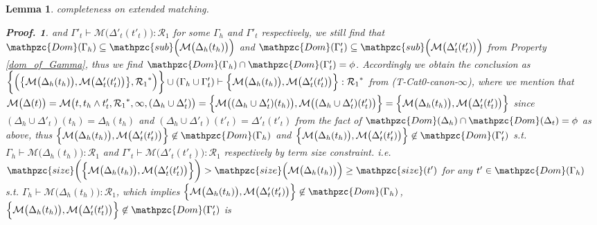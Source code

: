 \documentclass[12pt]{article}
\newtheorem{Lemma}{Lemma}[section]
\newtheorem{Proof}{Proof.}
\begin{document}
\begin{Lemma}{completeness on extended matching.}
\begin{Proof}
    and $\Gamma'_t \vdash \mathcal{M}\bigl(\Delta'_t(t'_t) \bigr) :
    \mathcal{R}_1$ for some $\Gamma_h$ and $\Gamma'_t$ respectively, we
    still find that
    $\mathpzc{Dom}(\Gamma_h) \subseteq \mathpzc{sub}\Bigl(\mathcal{M}\bigl(
    \Delta_h(t_h) \bigr) \Bigr)$ and
    $\mathpzc{Dom}(\Gamma'_t) \subseteq \mathpzc{sub}\Bigl(\mathcal{M}\bigl(
    \Delta'_t(t'_t) \bigr) \Bigr)$ from
    Property \ref{dom_of_Gamma}, thus we find
    $\mathpzc{Dom}(\Gamma_h) \cap \mathpzc{Dom}(\Gamma'_t) = \phi$.
    Accordingly we obtain the conclusion as
    $\biggl\{\Bigl(\bigl\{\mathcal{M}\bigl(\Delta_h(t_h) \bigr),
    \mathcal{M}\bigl(\Delta'_t(t'_t) \bigr) \bigr\}, {\mathcal{R}_1}^*
    \Bigr) \biggr\} \cup (\Gamma_h \cup \Gamma'_t) \vdash
    \Bigl\{\mathcal{M}\bigl(\Delta_h(t_h) \bigr), \mathcal{M}\bigl(
    \Delta'_t(t'_t) \bigr) \Bigr\} : {\mathcal{R}_1}^*$ from
    (T-Cat0-canon-$\infty$), where we mention that
    $\mathcal{M}\bigl(\Delta(t) \bigr) =
    \mathcal{M}\bigl(t, t_h \wedge t'_t, {\mathcal{R}_1}^*, \infty,
    (\Delta_h \cup \Delta'_t) \bigr) =
    \Bigl\{\mathcal{M}\bigl((\Delta_h \cup \Delta'_t)(t_h) \bigr),
    \mathcal{M}\bigl((\Delta_h \cup \Delta'_t)(t'_t) \bigr) \Bigr\} =
    \Bigl\{\mathcal{M}\bigl(\Delta_h(t_h) \bigr),
    \mathcal{M}\bigl(\Delta'_t(t'_t) \bigr) \Bigr\}$ since
    $(\Delta_h \cup \Delta'_t)(t_h) = \Delta_h(t_h)$ and
    $(\Delta_h \cup \Delta'_t)(t'_t) = \Delta'_t(t'_t)$ from the fact of
    $\mathpzc{Dom}(\Delta_h) \cap \mathpzc{Dom}(\Delta_t) = \phi$ as above,
    thus $\Bigl\{\mathcal{M}\bigl(\Delta_h(t_h) \bigr), \mathcal{M}\bigl(
    \Delta'_t(t'_t) \bigr) \Bigr\} \not\in \mathpzc{Dom}(\Gamma_h)$ and
    $\Bigl\{\mathcal{M}\bigl(\Delta_h(t_h) \bigr), \mathcal{M}\bigl(
    \Delta'_t(t'_t) \bigr) \Bigr\} \not\in \mathpzc{Dom}(\Gamma'_t)$ s.t.
    $\Gamma_h \vdash \mathcal{M}\bigl(\Delta_h(t_h) \bigr) : \mathcal{R}_1$
    and $\Gamma'_t \vdash \mathcal{M}\bigl(\Delta'_t(t'_t) \bigr) :
    \mathcal{R}_1$ respectively by term size constraint. i.e.
    $\mathpzc{size}\biggl(\Bigl\{\mathcal{M}\bigl(\Delta_h(t_h) \bigr),
    \mathcal{M}\bigl(\Delta'_t(t'_t) \bigr) \Bigr\} \biggr) >
    \mathpzc{size}\Bigl(\mathcal{M}\bigl(\Delta_h(t_h) \bigr) \Bigr) \ge
    \mathpzc{size}(t')$ for any $t' \in \mathpzc{Dom}(\Gamma_h)$ s.t.
    $\Gamma_h \vdash \mathcal{M}\bigl(\Delta_h(t_h) \bigr) : \mathcal{R}_1$, 
    which implies
    $\Bigl\{\mathcal{M}\bigl(\Delta_h(t_h) \bigr), \mathcal{M}\bigl(
    \Delta'_t(t'_t) \bigr) \Bigr\} \not\in \mathpzc{Dom}(\Gamma_h)$,
    $\Bigl\{\mathcal{M}\bigl(\Delta_h(t_h) \bigr), \mathcal{M}\bigl(
    \Delta'_t(t'_t) \bigr) \Bigr\} \not\in \mathpzc{Dom}(\Gamma'_t)$ is

\end{Proof}
\end{Lemma}
\end{document}
